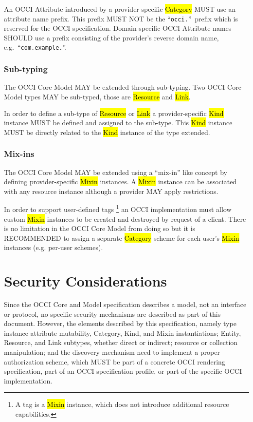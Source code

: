 \documentclass[10pt,a4paper]{article}
\begin{document}
An OCCI Attribute introduced by a provider-specific \hl{Category} MUST use
an attribute name prefix. This prefix MUST NOT be the
``\texttt{occi.}''~prefix which is reserved for the OCCI
specification. Domain-specific OCCI Attribute names SHOULD use a prefix
consisting of the provider's reverse domain name,
e.g.~``\texttt{com.example.}''.

\subsubsection{Sub-typing}
The OCCI Core Model MAY be extended through sub-typing.  Two OCCI
Core Model types MAY be sub-typed, those are \hl{Resource} and \hl{Link}.

In order to define a sub-type of \hl{Resource} or \hl{Link} a
provider-specific \hl{Kind} instance MUST be defined and assigned to
the sub-type. This \hl{Kind} instance MUST be directly related to the
\hl{Kind} instance of the type extended.

\subsubsection{Mix-ins}
The OCCI Core Model MAY be extended using a ``mix-in'' like concept by
defining provider-specific \hl{Mixin} instances.  A \hl{Mixin}
instance can be associated with any resource instance although a
provider MAY apply restrictions.

In order to support user-defined tags%
\footnote{A tag is a \hl{Mixin} instance, which does not introduce
  additional resource capabilities.}
an OCCI implementation must allow custom \hl{Mixin}
instances to be created and destroyed by request of a client.  There
is no limitation in the OCCI Core Model from doing so but it is
RECOMMENDED to assign a separate \hl{Category} scheme for each user's
\hl{Mixin} instances (e.g. per-user schemes).

\section{Security Considerations}
Since the OCCI Core and Model specification describes a model, not an interface
or protocol, no specific security mechanisms are described as part of this
document. However, the elements described by this specification, namely type
instance attribute mutability, Category, Kind, and Mixin instantiations; Entity,
Resource, and Link subtypes,  whether direct or indirect; resource or
collection manipulation; and the discovery mechanism need to implement a proper
authorization scheme, which MUST be part of a concrete OCCI rendering
specification, part of an OCCI specification profile, or part of the specific
OCCI implementation.
\end{document}
